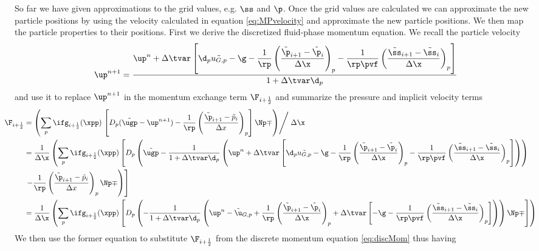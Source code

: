 So far we have given approximations to the grid values, e.g. $\ss$ and $\p$.
Once the grid values are calculated we can approximate the new particle positions by using the velocity calculated in equation \eqref{eq:MPvelocity} and approximate the new particle positions. 
We then map the particle properties to their positions.
\color{ForestGreen}
First we derive the discretized fluid-phase momentum equation. 
We recall the particle velocity
\begin{equation}
    \label{eq:advVelocity}
    \up^{n+1} = \dfrac{\up^n + \Delta \tvar \left[\d_p \tilde{u_{G,p}} - \g - \dfrac{1}{\rp} \left(\dfrac{\tilde{\p}_{i+1} - \tilde{\p}_i}{\Delta \x} \right)_p - \dfrac{1}{\rp \pvf} \left( \dfrac{\tilde{\ss}_{i+1} - \tilde{\ss}_i}{\Delta \x}\right)_p \right]}{1 + \Delta \tvar \d_p}
\end{equation}
and use it to replace $\up^{n+1}$ in the momentum exchange term $\F_{i+\frac{1}{2}}$ and summarize the pressure and implicit velocity terms
\begin{align*}
    \hspace{-0.5cm} \F_{i+\frac{1}{2}} &= \left( \sum_p \ifg_{i+\frac{1}{2}} (\xpp) \left. \left[ D_p (\tilde{\ugp} - 
    \up^{n+1} 
    ) - \dfrac{1}{\rp} \left( \dfrac{\tilde{\p}_{i+1} - \tilde{p}_i}{\Delta x}\right)_p \right] \Np \mp \right) \middle / \right. \Delta \x \\
    &=  \dfrac{1}{\Delta \x} \left( \sum_p \ifg_{i+\frac{1}{2}} (\xpp) \left[ D_p \left(\tilde{\ugp} - 
    \dfrac{1}{1 + \Delta \tvar \d_p}    
    \left( \up^n + \Delta \tvar \left[\d_p \tilde{u_{G,p}} - \g - \dfrac{1}{\rp} \left(\dfrac{\tilde{\p}_{i+1} - \tilde{\p}_i}{\Delta \x} \right)_p - \dfrac{1}{\rp \pvf} \left( \dfrac{\tilde{\ss}_{i+1} - \tilde{\ss}_i}{\Delta \x}\right)_p \right] \right) \right) \right. \right. \\
    & \left. \left. - \dfrac{1}{\rp} \left( \dfrac{\tilde{\p}_{i+1} - \tilde{p}_i}{\Delta x}\right)_p \Np \mp \right) \right] \\
    &=  \dfrac{1}{\Delta \x} \left( \sum_p \ifg_{i+\frac{1}{2}} (\xpp) \left[ D_p \left(-  \dfrac{1}{1 + \Delta \tvar \d_p} \left(   \up^n - \tilde{\u}_{G,p}     + \dfrac{1}{\rp} \left(\dfrac{\tilde{\p}_{i+1} - \tilde{\p}_i}{\Delta \x} \right)_p + \Delta \tvar \left[ - \g - \dfrac{1}{\rp \pvf} \left( \dfrac{\tilde{\ss}_{i+1} - \tilde{\ss}_i}{\Delta \x}\right)_p \right] \right) \right) \Np \mp \right]\right)
\end{align*}
We then use the former equation to substitute $\F_{i+\frac{1}{2}}$ from the discrete momentum equation \eqref{eq:discMom} thus having
